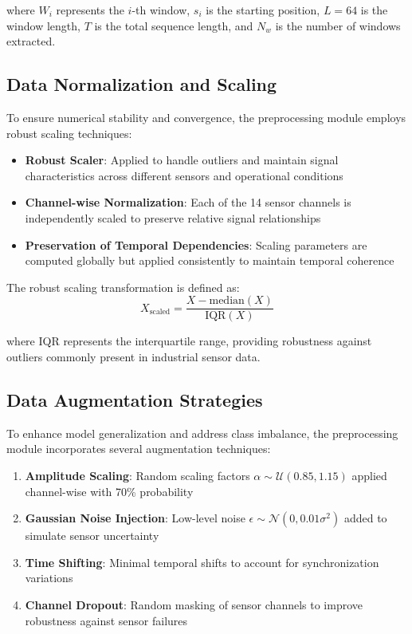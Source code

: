 where $W_i$ represents the $i$-th window, $s_i$ is the starting position, $L = 64$ is the window length, $T$ is the total sequence length, and $N_w$ is the number of windows extracted.

\subsection{Data Normalization and Scaling}
\label{subsec:normalization}

To ensure numerical stability and convergence, the preprocessing module employs robust scaling techniques:

\begin{itemize}
    \item \textbf{Robust Scaler}: Applied to handle outliers and maintain signal characteristics across different sensors and operational conditions
    \item \textbf{Channel-wise Normalization}: Each of the 14 sensor channels is independently scaled to preserve relative signal relationships
    \item \textbf{Preservation of Temporal Dependencies}: Scaling parameters are computed globally but applied consistently to maintain temporal coherence
\end{itemize}

The robust scaling transformation is defined as:
\begin{equation}
X_{\text{scaled}} = \frac{X - \text{median}(X)}{\text{IQR}(X)}
\end{equation}

where IQR represents the interquartile range, providing robustness against outliers commonly present in industrial sensor data.

\subsection{Data Augmentation Strategies}
\label{subsec:data_augmentation}

To enhance model generalization and address class imbalance, the preprocessing module incorporates several augmentation techniques:

\begin{enumerate}
    \item \textbf{Amplitude Scaling}: Random scaling factors $\alpha \sim \mathcal{U}(0.85, 1.15)$ applied channel-wise with 70\% probability
    \item \textbf{Gaussian Noise Injection}: Low-level noise $\epsilon \sim \mathcal{N}(0, 0.01\sigma^2)$ added to simulate sensor uncertainty  
    \item \textbf{Time Shifting}: Minimal temporal shifts to account for synchronization variations
    \item \textbf{Channel Dropout}: Random masking of sensor channels to improve robustness against sensor failures
\end{enumerate}

